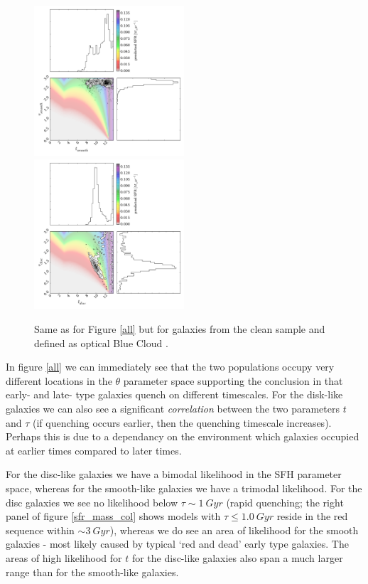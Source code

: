 \documentclass{mn2e}
\begin{document}
\begin{figure}
\includegraphics[width=0.4975\textwidth]{blue_c_smooth_clean.pdf}
\includegraphics[width=0.4975\textwidth]{blue_c_disc_clean.pdf}
\caption{Same as for Figure \ref{all} but for galaxies from the clean sample and defined as optical Blue Cloud \cite{Baldry04}.}
\label{blue_c_clean}
\end{figure}

In figure \ref{all} we can immediately see that the two populations occupy very different locations in the $\theta$ parameter space supporting the conclusion in \citet{Sch2014} that early- and late- type galaxies quench on different timescales. For the disk-like galaxies we can also see a significant \emph{correlation} between the two parameters $t$ and $\tau$ (if quenching occurs earlier, then the quenching timescale increases). Perhaps this is due to a dependancy on the environment which galaxies occupied at earlier times compared to later times. 

For the disc-like galaxies we have a bimodal likelihood in the SFH parameter space, whereas for the smooth-like galaxies we have a trimodal likelihood. For the disc galaxies we see no likelihood below $\tau \sim 1~Gyr$ (rapid quenching; the right panel of figure \ref{sfr_mass_col} shows models with $\tau \leq 1.0~Gyr$ reside in the red sequence within $\sim 3~Gyr$), whereas we do see an area of likelihood for the smooth galaxies - most likely caused by typical `red and dead' early type galaxies. The areas of high likelihood for $t$ for the disc-like galaxies also span a much larger range than for the smooth-like galaxies.
\end{document}

